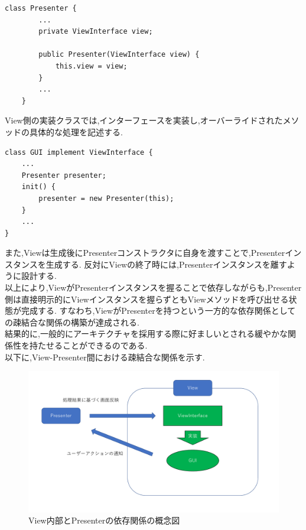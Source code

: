 \documentclass[uplatex,12pt]{jsarticle}
\begin{document}
\begin{lstlisting}[caption=PresenterにおけるViewInterface型インスタンスの生成, label=mid]
    class Presenter {
        ...
        private ViewInterface view;

        public Presenter(ViewInterface view) {
            this.view = view;
        }
        ...
    }
\end{lstlisting}
View側の実装クラスでは,インターフェースを実装し,オーバーライドされたメソッドの具体的な処理を記述する.
\begin{lstlisting}[caption=GUIにおけるPresenterインスタンス生成, label=mid]
    class GUI implement ViewInterface {
    ...
    Presenter presenter;
    init() {
        presenter = new Presenter(this);
    }
    ...
}
\end{lstlisting}
また,Viewは生成後にPresenterコンストラクタに自身を渡すことで,Presenterインスタンスを生成する.
反対にViewの終了時には,Presenterインスタンスを離すように設計する. \\

以上により,ViewがPresenterインスタンスを握ることで依存しながらも,Presenter側は直接明示的にViewインスタンスを握らずともViewメソッドを呼び出せる状態が完成する.
すなわち,ViewがPresenterを持つという一方的な依存関係としての疎結合な関係の構築が達成される. \\
結果的に,一般的にアーキテクチャを採用する際に好ましいとされる緩やかな関係性を持たせることができるのである. \\
以下に,View-Presenter間における疎結合な関係を示す.
\begin{figure}[!hbt]
    \centering
    \includegraphics[scale=0.35]{images/view.pdf}
    \caption{View内部とPresenterの依存関係の概念図}
\end{figure}

\newpage
\end{document}
